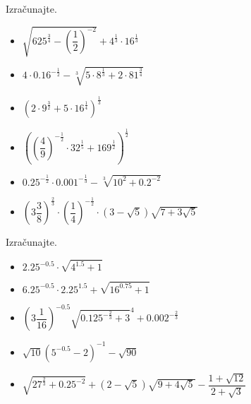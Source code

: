         
            \begin{naloga}
                Izračunajte.
                \begin{itemize}
                    \item $\displaystyle \sqrt{625^\frac{3}{4}-\left(\dfrac{1}{2}\right)^{-2}}+4^\frac{1}{3}\cdot 16^\frac{1}{3} $ 
                    \item $\displaystyle 4\cdot 0.16^{-\frac{1}{2}}-\sqrt[3]{5\cdot 8^\frac{1}{3}+2\cdot 81^\frac{3}{4}} $ 
                    \item $\displaystyle \left(2\cdot 9^\frac{3}{2}+5\cdot 16^\frac{1}{4}\right)^\frac{1}{3} $ 
                    \item $\displaystyle \left(\left(\dfrac{4}{9}\right)^{-\frac{1}{2}}\cdot 32^\frac{1}{5}+169^\frac{1}{2}\right)^\frac{1}{2} $ 
                    \item $\displaystyle 0.25^{-\frac{1}{2}}\cdot 0.001^{-\frac{1}{3}} -\sqrt[3]{10^2+0.2^{-2}} $ 
                    \item $\displaystyle \left(3\dfrac{3}{8}\right)^\frac{2}{3}\cdot\left(\dfrac{1}{4}\right)^{-\frac{1}{2}}\cdot\left(3-\sqrt{5}\right)\sqrt{7+3\sqrt{5}} $ 
                \end{itemize}
            \end{naloga}
        


        
            \begin{naloga}
                Izračunajte.
                \begin{itemize}
                    \item $\displaystyle 2.25^{-0.5}\cdot\sqrt{4^{1.5}+1} $ 
                    \item $\displaystyle 6.25^{-0.5}\cdot 2.25^{1.5}+\sqrt{16^{0.75}+1} $ 
                    \item $\displaystyle \left(3\dfrac{1}{16}\right)^{-0.5}\sqrt{0.125^{-\frac{2}{3}}+3}^4+0.002^{-\frac{2}{3}} $ 
                    \item $\displaystyle \sqrt{10}\left(5^{-0.5}-2\right)^{-1}-\sqrt{90} $ 
                    \item $\displaystyle \sqrt{27^\frac{2}{3}+0.25^{-2}}+\left(2-\sqrt{5}\right)\sqrt{9+4\sqrt{5}}-\dfrac{1+\sqrt{12}}{2+\sqrt{3}} $ 
                \end{itemize}
            \end{naloga}
        



